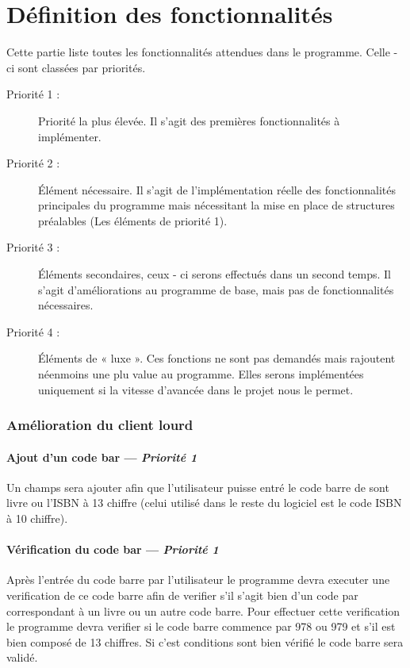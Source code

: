 \part{Définition des fonctionnalités}
Cette partie liste toutes les fonctionnalités attendues dans le programme. Celle - ci sont classées par priorités.

\begin{description}
\item [Priorité 1 :]
	Priorité la plus élevée. Il s'agit des premières fonctionnalités à implémenter.

\item [Priorité 2 :]
	Élément nécessaire. Il s'agit de l'implémentation réelle des fonctionnalités principales du programme mais nécessitant la mise en place de structures préalables (Les éléments de priorité 1). 

\item [Priorité 3 :]
	Éléments secondaires, ceux - ci serons effectués dans un second temps. Il s'agit d'améliorations au programme de base, mais pas de fonctionnalités nécessaires.  

\item [Priorité 4 :]
	Éléments de « luxe ». Ces fonctions ne sont pas demandés mais rajoutent néenmoins une plu value au programme. Elles serons implémentées uniquement si la vitesse d'avancée dans le projet nous le permet.
\end{description}


\section{Amélioration du client lourd}


\subsection[Ajout d'un code bar]{Ajout d'un code bar — \emph{Priorité 1}}
Un champs sera ajouter afin que l'utilisateur puisse entré le code barre de sont livre ou l'ISBN à 13 chiffre (celui utilisé dans le reste du logiciel est le code ISBN à 10 chiffre).

\subsection[Vérification du code bar]{Vérification du code bar — \emph{Priorité 1}}
Après l'entrée du code barre par l'utilisateur le programme devra executer une verification de ce code barre afin de verifier s'il s'agit bien d'un code par correspondant à un livre ou un autre code barre. Pour effectuer cette verification le programme devra verifier si le code barre commence par 978 ou 979 et s'il est bien composé de 13 chiffres. Si c'est conditions sont bien vérifié le code barre sera validé. 

